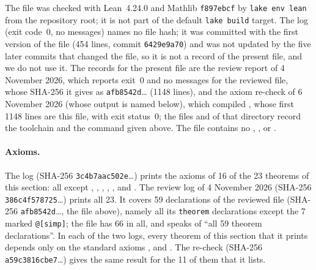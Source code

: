The file was checked with Lean~4.24.0 and Mathlib \texttt{f897ebcf} by \texttt{lake env lean} from the repository root;
it is not part of the default \texttt{lake build} target. The log  (exit code~0, no
messages) names no file hash; it was committed with the first version of the file (454 lines, commit
\texttt{6429e9a70}) and was not updated by the five later commits that changed the file, so it is not a record of the
present file, and we do not use it. The records for the present file are the review report
 of 4 November 2026, which reports exit~0 and no messages for the reviewed file, whose
SHA-256 it gives as \texttt{afb8542d}\dots{} (1148 lines), and the axiom re-check of 6 November 2026 (whose output is
named below), which compiled
, whose first 1148 lines are this file, with exit
status~0; the files  and  of that directory record the toolchain and the command given
above. The file contains no , ,  or .

\paragraph{Axioms.} The log  (SHA-256 \texttt{3c4b7aac502e}\dots) prints the axioms of
16 of the 23 theorems of this section: all except , ,
, , ,  and
. The review log  of 4 November 2026 (SHA-256
\texttt{386c4f578725}\dots) prints all 23. It covers 59 declarations of the reviewed file (SHA-256
\texttt{afb8542d}\dots, the file above), namely all its \texttt{theorem} declarations except the 7 marked
\texttt{@[simp]}; the file has 66 in all, and  speaks of ``all 59 theorem
declarations''. In each of the two logs, every theorem of this section that it prints depends only on the standard
axioms ,  and . The re-check
 (SHA-256 \texttt{a59c3816cbe7}\dots) gives the same result for
the 11 of them that it lists.

